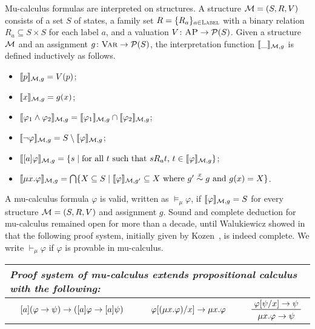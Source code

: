 \documentclass{amsart}
\begin{document}
Mu-calculus formulas are interpreted on structures.
A structure $\mathcal{M} = (S, R, V)$ consists of
a set $S$ of states,
a family set $R = \{R_a\}_{a \in \textsc{Label}}$ with a binary relation $R_a \subseteq
S \times S$
for each label $a$,
and a valuation $V \colon \textsc{AP} \to \mathcal{P}(S)$.
Given a structure $\mathcal{M}$ and an assignment $g \colon {\normalfont\textsc{Var}} \to \mathcal{P}(S)$,
the interpretation function
$\llbracket\_\rrbracket_{\mathcal{M},g}$ is defined inductively as follows.
\begin{itemize}
	\item $\llbracket p\rrbracket_{\mathcal{M},g} = V(p)$;
	\item $\llbracket x\rrbracket_{\mathcal{M},g} = g(x)$;
	\item $\llbracket\varphi_1 \wedge \varphi_2\rrbracket_{\mathcal{M},g} =
	\llbracket\varphi_1\rrbracket_{\mathcal{M},g} \cap
	\llbracket\varphi_2\rrbracket_{\mathcal{M},g}$;
	\item $\llbracket\neg \varphi\rrbracket_{\mathcal{M},g} =
	S \setminus \llbracket\varphi\rrbracket_{\mathcal{M},g}$;    
	\item $\llbracket[a]\varphi\rrbracket_{\mathcal{M},g} =
	\{ s \mid \text{for all $t$ such that $s R_a t$, 
		$t \in \llbracket\varphi\rrbracket_{\mathcal{M},g}$} \}$;
	\item $\llbracket\mu x . \varphi\rrbracket_{\mathcal{M},g} =
	\bigcap \{ X \subseteq S \mid \llbracket\varphi\rrbracket_{\mathcal{M},g'} \subseteq X
	\text{ where $g' \overset{x}{\sim} g$ and $g(x) = X$} \}$.
\end{itemize}
A mu-calculus formula $\varphi$ is valid, written as $\vDash_\mu \varphi$,
if $\llbracket\varphi\rrbracket_{\mathcal{M},g} = S$ for every structure $\mathcal{M} = (S,R,V)$ and
assignment $g$.
Sound and complete deduction for mu-calculus remained open for more than a
decade,
until Walukiewicz showed in~\cite{bibid} that
the following proof system, initially given by Kozen~\cite{bibid}, 
is indeed complete.
We write $\vdash_\mu \varphi$ if $\varphi$ is provable in mu-calculus.
\begin{center}
	\begin{tabular}{lllllm{2cm}}
		\multicolumn{6}{l}{\em Proof system of mu-calculus extends
			propositional calculus with the following:}
		\\\hline
		\prule{K}&
		$[a](\varphi \to \psi) \to
		([a]\varphi \to [a]\psi)$
		&
		\prule{Mu$_1$}&
		$\varphi[(\mu x . \varphi) / x] \to \mu x . \varphi$
		&
		\prule{Mu$_2$}&
		$\prftree{\varphi[\psi / x] \imp \psi}{\mu x . \varphi \imp \psi}$
	\end{tabular}
\end{center}
\end{document}

